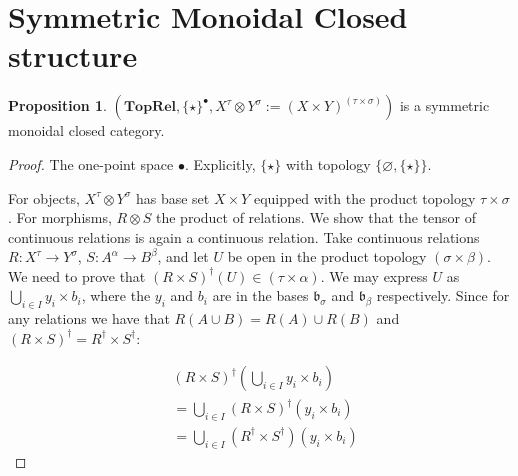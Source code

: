\documentclass{tufte-handout}
\theoremstyle{definition}
\newtheorem{proposition}[theorem]{Proposition}
\newtheorem{rem}[theorem]{Reminder}
\begin{document}
\section{Symmetric Monoidal Closed structure}


\begin{proposition}
$(\mathbf{TopRel},\{\star\}^{\bullet},X^\tau \otimes Y^\sigma := (X \times Y)^{(\tau \times \sigma)})$ is a symmetric monoidal closed category.
\begin{proof}

 The one-point space $\bullet$. Explicitly, $\{\star\}$ with topology $\{\varnothing,\{\star\}\}$.


 For objects, $X^\tau \otimes Y^\sigma$ has base set $X \times Y$ equipped with the product topology $\tau \times \sigma$. For morphisms, $R \otimes S$ the product of relations. We show that the tensor of continuous relations is again a continuous relation. Take continuous relations $R: X^\tau \rightarrow Y^\sigma$, $S: A^\alpha \rightarrow B^\beta$, and let $U$ be open in the product topology $(\sigma \times \beta)$. We need to prove that $(R \times S)^\dag(U) \in (\tau \times \alpha)$. We may express $U$ as $\bigcup\limits_{i \in I} y_i \times b_i$, where the $y_i$ and $b_i$ are in the bases $\mathfrak{b}_\sigma$ and $\mathfrak{b}_\beta$ respectively. Since for any relations we have that $R(A \cup B) = R(A) \cup R(B)$ and $(R \times S)^\dag = R^\dag \times S^\dag$:

\begin{align*}
&(R \times S)^\dag(\bigcup\limits_{i \in I} y_i \times b_i)\\
 &= \bigcup\limits_{i \in I}(R \times S)^\dag(y_i \times b_i)\\
 &= \bigcup\limits_{i \in I}(R^\dag \times S^\dag)(y_i \times b_i)
 \end{align*}


\end{proof}
\end{proposition}
\end{document}
